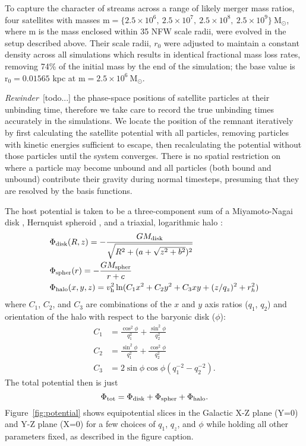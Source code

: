 \documentclass[letterpaper,12pt,preprint]{aastex}
\newcommand{\msun}{\mathrm{M}_\odot}
\newcommand{\vhalo}{v_{\rm h}}
\newcommand{\rewinder}{\emph{Rewinder}}
\begin{document}
To capture the character of streams across a range of likely merger mass ratios, four satellites with masses $\mathrm{m} = \{2.5 \times 10^6,\ 2.5 \times 10^7,\ 2.5 \times 10^8,\ 2.5 \times 10^9\}\ \msun$, where m is the mass enclosed within 35 NFW scale radii, were evolved in the setup described above. Their scale radii, $r_0$ were adjusted to maintain a constant density across all simulations which results in identical fractional mass loss rates, removing 74\% of the initial mass by the end of the simulation; the base value is $\mathrm{r_0}=0.01565$ kpc at $\mathrm{m} = 2.5 \times 10^6\ \msun$.

\rewinder\ [todo...] the phase-space positions of satellite particles at their unbinding time, therefore we take care to record the true unbinding times accurately in the simulations. We locate the position of the remnant iteratively by first calculating the satellite potential with all particles, removing particles with kinetic energies sufficient to escape, then recalculating the potential without those particles until the system converges. There is no spatial restriction on where a particle may become unbound and all particles (both bound and unbound) contribute their gravity during normal timesteps, presuming that they are resolved by the basis functions. 

The host potential is taken to be a three-component sum of a Miyamoto-Nagai disk \citep{miyamoto75}, Hernquist spheroid , and a triaxial, logarithmic halo \citep[e.g.,][]{law10}:
\begin{align}
	&\Phi_{\rm disk}(R,z) = -\frac{GM_{\rm disk}}{\sqrt{R^2 + (a + \sqrt{z^2 + b^2})^2}}\\
	&\Phi_{\rm spher}(r) = -\frac{GM_{\rm spher}}{r + c}\\
	&\Phi_{\rm halo}(x,y,z) = \vhalo^2 \ln(C_1 x^2 + C_2 y^2 + C_3 xy + (z/q_z)^2 + r_h^2)
\end{align}
where $C_1$, $C_2$, and $C_3$ are combinations of the $x$ and $y$ axis
ratios ($q_1$, $q_2$) and orientation of the halo with respect to the
baryonic disk ($\phi$):
\begin{align}
  C_1 &= \frac{\cos^2\phi}{q_1^2} + \frac{\sin^2\phi}{q_2^2}\\
  C_2 &= \frac{\sin^2\phi}{q_1^2} + \frac{\cos^2\phi}{q_2^2}\\
  C_3 &= 2\sin\phi\cos\phi \left(q_1^{-2} - q_2^{-2}\right).
\end{align}
The total potential then is just
\begin{equation}
	\Phi_{\rm tot} = \Phi_{\rm disk} + \Phi_{\rm spher} + \Phi_{\rm halo}\label{eq:lm10}.
\end{equation}
Figure~\ref{fig:potential} shows equipotential slices in the Galactic X-Z plane (Y=0) and Y-Z plane (X=0) for a few choices of  $q_1$,  $q_z$, and $\phi$ while holding all other parameters fixed, as described in the figure caption.
\end{document}
